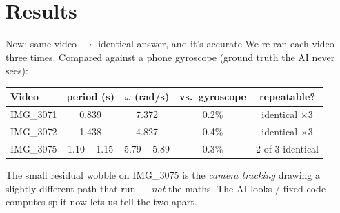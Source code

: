 \documentclass[10pt,aspectratio=169]{beamer}
\newcommand{\gd}[1]{\textcolor{good}{#1}}
\newcommand{\bd}[1]{\textcolor{bad}{#1}}
\begin{document}
\section{Results}

\begin{frame}{Now: same video $\to$ identical answer, and it's accurate}
We re-ran each video three times. Compared against a phone gyroscope (ground truth the AI never sees):
\centering\small
\begin{tabular}{lcccc}
\toprule
Video & period (s) & $\omega$ (rad/s) & vs.\ gyroscope & repeatable? \\
\midrule
IMG\_3071 & \gd{0.839} & \gd{7.372} & \gd{0.2\%} & \gd{identical $\times$3} \\
IMG\_3072 & \gd{1.438} & \gd{4.827} & \gd{0.4\%} & \gd{identical $\times$3} \\
IMG\_3075 & 1.10 -- 1.15 & 5.79 -- 5.89 & \gd{0.3\%} & 2 of 3 identical \\
\bottomrule
\end{tabular}
\par\vspace{0.7em}
\par\vspace{0.5em}
\footnotesize The small residual wobble on IMG\_3075 is the \emph{camera tracking} drawing a slightly different path that run --- \emph{not} the maths. The AI-looks / fixed-code-computes split now lets us tell the two apart.
\end{frame}
\end{document}
